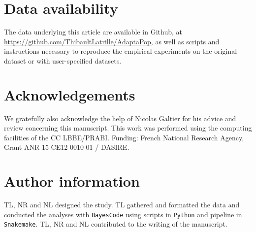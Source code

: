 \documentclass{article}
\begin{document}
    \section{Data availability}\label{sec:data-availability}

    The data underlying this article are available in Github, at \url{https://github.com/ThibaultLatrille/AdaptaPop}, as well as scripts and instructions necessary to reproduce the empirical experiments on the original dataset or with user-specified datasets.


    \section{Acknowledgements}\label{sec:acknowledgements}

    We gratefully also acknowledge the help of Nicolas Galtier for his advice and review concerning this manuscript.
    This work was performed using the computing facilities of the CC LBBE/PRABI.
    Funding: French National Research Agency, Grant ANR-15-CE12-0010-01 / DASIRE.


    \section{Author information}\label{sec:author-information}
    TL, NR and NL designed the study.
    TL gathered and formatted the data and conducted the analyses with \texttt{BayesCode} using scripts in \texttt{Python} and pipeline in \texttt{Snakemake}.
    TL, NR and NL contributed to the writing of the manuscript.

    \printbibliography
\end{document}
